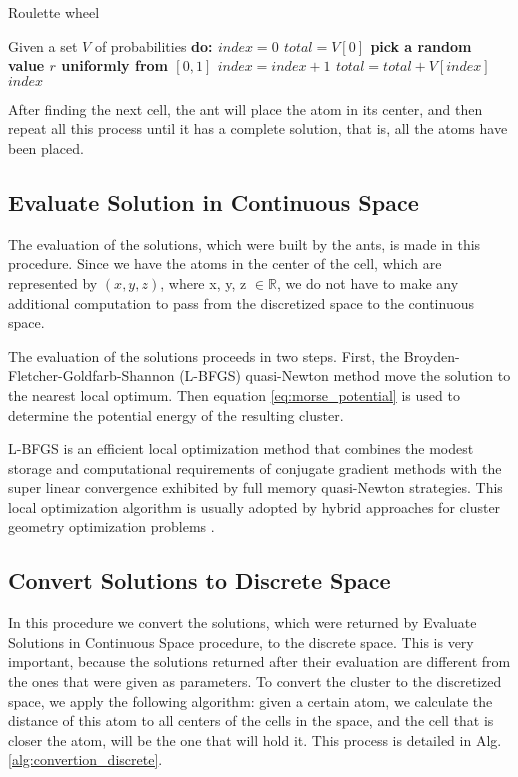			\begin{algorithm}
				\caption{Roulette wheel}
				\label{alg:roulette_wheel}
				\begin{algorithmic}
				\STATE Given a set $V$ of probabilities \bf{do}:
				\STATE $index = 0$
				\STATE $total = V[0]$
				\STATE pick a random value $r$ uniformly from $[0,1]$
					\STATE $index = index + 1$
					\STATE $total = total + V[index]$		
				\ENDWHILE
				\RETURN $index$
				\end{algorithmic}
			\end{algorithm}
			
			After finding the next cell, the ant will place the atom in its center, and then repeat all this process until it has a complete solution, that is, all the atoms have been placed.
			
			\subsection{Evaluate Solution in Continuous Space}
			
			The evaluation of the solutions, which were built by the ants, is made in this procedure. Since we have the atoms in the center of the cell, which are represented by $(x,y,z)$, where x, y, z $\in \mathbb{R}$, we do not have to make any additional computation to pass from the discretized space to the continuous space.
			
			The evaluation of the solutions proceeds in two steps. First, the Broyden-Fletcher-Goldfarb-Shannon (L-BFGS) quasi-Newton method \cite{liu89} move the solution to the nearest local optimum. Then equation \ref{eq:morse_potential} is used to determine the potential energy of the resulting cluster.

			L-BFGS is an efficient local optimization method that combines the modest storage and computational requirements of conjugate gradient methods with the super linear convergence exhibited by full memory quasi-Newton strategies. This local optimization algorithm is usually adopted by hybrid approaches for cluster geometry optimization problems \cite{grosso07, johnston03, xico09}.
						
			\subsection{Convert Solutions to Discrete Space}
			In this procedure we convert the solutions, which were returned by Evaluate Solutions in Continuous Space procedure, to the discrete space. This is very important, because the solutions returned after their evaluation are different from the ones that were given as parameters.
			To convert the cluster to the discretized space, we apply the following algorithm: given a certain atom, we calculate the distance of this atom to all centers of the cells in the space, and the cell that is closer the atom, will be the one that will hold it. This process is detailed in Alg. \ref{alg:convertion_discrete}.
			
